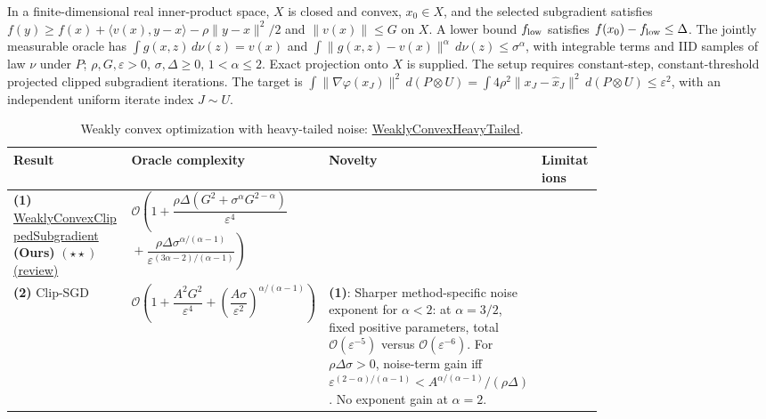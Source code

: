 \begin{table}[tp]
\centering
\caption{Weakly convex optimization with heavy-tailed noise: \href{https://github.com/k3nfalt/longtails/blob/main/LongTails/Setups/WeaklyConvexHeavyTailed.lean}{WeaklyConvexHeavyTailed}.}\label{tab:WeaklyConvexHeavyTailed}
\parbox{\linewidth}{\footnotesize In a finite-dimensional real inner-product space, $X$ is closed and convex, $x_0\in X$, and the selected subgradient satisfies $f(y)\ge f(x)+\langle v(x),y-x\rangle-\rho\|y-x\|^2/2$ and $\|v(x)\|\le G$ on $X$. A lower bound $f_{\rm low}$ satisfies $f(x_0)-f_{\rm low}\le\Delta$. The jointly measurable oracle has $\int g(x,z)\,d\nu(z)=v(x)$ and $\int\|g(x,z)-v(x)\|^\alpha\,d\nu(z)\le\sigma^\alpha$, with integrable terms and IID samples of law $\nu$ under $P$; $\rho,G,\varepsilon>0$, $\sigma,\Delta\ge0$, $1<\alpha\le2$. Exact projection onto $X$ is supplied. The setup requires constant-step, constant-threshold projected clipped subgradient iterations. The target is $\int\|\nabla\varphi(x_J)\|^2\,d(P\otimes U)=\int4\rho^2\|x_J-\hat x_J\|^2\,d(P\otimes U)\le\varepsilon^2$, with an independent uniform iterate index $J\sim U$.}\par\smallskip
\begin{threeparttable}
\footnotesize
\setlength{\tabcolsep}{4pt}\renewcommand{\arraystretch}{1.25}
\begin{tabularx}{\linewidth}{@{}>{\raggedright\arraybackslash}p{0.20\linewidth}>{\raggedright\arraybackslash}p{0.32\linewidth}>{\raggedright\arraybackslash}p{0.25\linewidth}>{\raggedright\arraybackslash}X@{}}
\toprule
\textbf{Result} & \textbf{Oracle complexity} & \textbf{Novelty} & \textbf{Limitations} \\
\midrule
\textbf{(1)} \href{https://github.com/k3nfalt/longtails/blob/main/LongTails/Theorems/WeaklyConvexClippedSubgradient.lean}{Weakly\allowbreak Convex\allowbreak Clipped\allowbreak Subgradient} \textbf{(Ours)} $(\star\star)$ \href{https://github.com/k3nfalt/longtails/blob/main/scripts/reviews/WeaklyConvexClippedSubgradient.md}{(review)}
& $\mathcal{O}\!\left(1+\dfrac{\rho\Delta(G^2+\sigma^\alpha G^{2-\alpha})}{\varepsilon^4}\right.$\newline
$\left.{}+\dfrac{\rho\Delta\sigma^{\alpha/(\alpha-1)}}{\varepsilon^{(3\alpha-2)/(\alpha-1)}}\right)$ & & \\
\midrule[1.2pt]
\textbf{(2)} Clip-SGD \citep[Thm.~5, v1]{wchtZhu2025v1}
& $\mathcal{O}\!\left(1+\dfrac{A^2G^2}{\varepsilon^4}+\left(\dfrac{A\sigma}{\varepsilon^2}\right)^{\!\alpha/(\alpha-1)}\right)$
& \textbf{(1)}: Sharper method-specific noise exponent for $\alpha<2$: at $\alpha=3/2$, fixed positive parameters, total $\mathcal{O}(\varepsilon^{-5})$ versus $\mathcal{O}(\varepsilon^{-6})$. For $\rho\Delta\sigma>0$, noise-term gain iff $\varepsilon^{(2-\alpha)/(\alpha-1)}<A^{\alpha/(\alpha-1)}/(\rho\Delta)$. No exponent gain at $\alpha=2$.

\end{tabularx}
\end{threeparttable}
\end{table}
